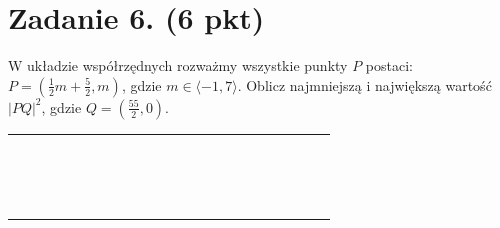 \documentclass[10pt]{article}
\begin{document}
\section*{Zadanie 6. (6 pkt)}
W układzie współrzędnych rozważmy wszystkie punkty \(P\) postaci: \(P=\left(\frac{1}{2} m+\frac{5}{2}, m\right)\), gdzie \(m \in\langle-1,7\rangle\). Oblicz najmniejszą i największą wartość \(|P Q|^{2}\), gdzie \(Q=\left(\frac{55}{2}, 0\right)\).

\begin{center}
\begin{tabular}{|c|c|c|c|c|c|c|c|c|c|c|c|c|c|c|c|c|c|c|c|c|c|c|}
\hline
 &  &  &  &  &  &  &  &  &  &  &  &  &  &  &  &  &  &  &  &  &  &  \\
\hline
 &  &  &  &  &  &  &  &  &  &  &  &  &  &  &  &  &  &  &  &  &  &  \\
\hline
 &  &  &  &  &  &  &  &  &  &  &  &  &  &  &  &  &  &  &  &  &  &  \\
\hline
 &  &  &  &  &  &  &  &  &  &  &  &  &  &  &  &  &  &  &  &  &  &  \\
\hline
 &  &  &  &  &  &  &  &  &  &  &  &  &  &  &  &  &  &  &  &  &  &  \\
\hline
 &  &  &  &  &  &  &  &  &  &  &  &  &  &  &  &  &  &  &  &  &  &  \\
\hline
 &  &  &  &  &  &  &  &  &  &  &  &  &  &  &  &  &  &  &  &  &  &  \\
\hline
 &  &  &  &  &  &  &  &  &  &  &  &  &  &  &  &  &  &  &  &  &  &  \\
\hline
 &  &  &  &  &  &  &  &  &  &  &  &  &  &  &  &  &  &  &  &  &  &  \\
\hline
 &  &  &  &  &  &  &  &  &  &  &  &  &  &  &  &  &  &  &  &  &  &  \\
\hline
 &  &  &  &  &  &  &  &  &  &  &  &  &  &  &  &  &  &  &  &  &  &  \\
\hline
 &  &  &  &  &  &  &  &  &  &  &  &  &  &  &  &  &  &  &  &  &  &  \\
\hline
 &  &  &  &  &  &  &  &  &  &  &  &  &  &  &  &  &  &  &  &  &  &  \\
\hline
 &  &  &  &  &  &  &  &  &  &  &  &  &  &  &  &  &  &  &  &  &  &  \\
\hline
 &  &  &  &  &  &  &  &  &  &  &  &  &  &  &  &  &  &  &  &  &  &  \\
\hline
 &  &  &  &  &  &  &  &  &  &  &  &  &  &  &  &  &  &  &  &  &  &  \\
\hline
 &  &  &  &  &  &  &  &  &  &  &  &  &  &  &  &  &  &  &  &  &  &  \\

\end{tabular}
\end{center}
\end{document}
